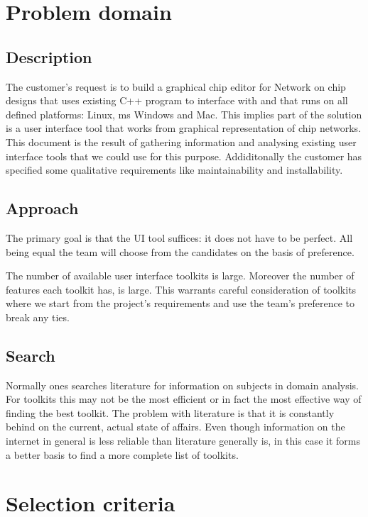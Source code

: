 \section{Problem domain}
\subsection{Description}

The customer's request is to build a graphical chip editor for Network on chip
designs that uses existing C++ program to interface with and that runs on all
defined platforms: Linux, ms Windows and Mac. This implies part of the solution
is a user interface tool that works from graphical representation of chip
networks. This document is the result of gathering information and analysing
existing user interface tools that we could use for this purpose. Addiditonally
the customer has specified some qualitative requirements like maintainability
and installability.

\subsection{Approach}

The primary goal is that the UI tool suffices: it does not have to be perfect.
All being equal the team will choose from the candidates on the basis of
preference.

The number of available user interface toolkits is large.  Moreover the number
of features each toolkit has, is large. This warrants careful consideration
of toolkits where we start from the project's requirements and use the team's
preference to break any ties.

\subsection{Search}

Normally ones searches literature for information on subjects in domain
analysis.  For toolkits this may not be the most efficient or in fact the most
effective way of finding the best toolkit. The problem with literature is that
it is constantly behind on the current, actual state of affairs. Even though
information on the internet in general is less reliable than literature
generally is, in this case it forms a better basis to find a more complete list
of toolkits.

\section{Selection criteria}

